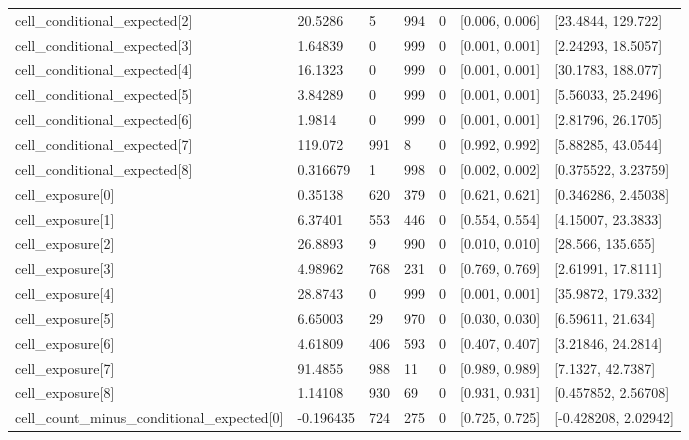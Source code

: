 \begin{longtable}
{}cell\_\allowbreak{}conditional\_\allowbreak{}expected[2] & 20.5286 & 5 & 994 & 0 & [0.006, 0.006] & [23.4844, 129.722] \\
{}cell\_\allowbreak{}conditional\_\allowbreak{}expected[3] & 1.64839 & 0 & 999 & 0 & [0.001, 0.001] & [2.24293, 18.5057] \\
{}cell\_\allowbreak{}conditional\_\allowbreak{}expected[4] & 16.1323 & 0 & 999 & 0 & [0.001, 0.001] & [30.1783, 188.077] \\
{}cell\_\allowbreak{}conditional\_\allowbreak{}expected[5] & 3.84289 & 0 & 999 & 0 & [0.001, 0.001] & [5.56033, 25.2496] \\
{}cell\_\allowbreak{}conditional\_\allowbreak{}expected[6] & 1.9814 & 0 & 999 & 0 & [0.001, 0.001] & [2.81796, 26.1705] \\
{}cell\_\allowbreak{}conditional\_\allowbreak{}expected[7] & 119.072 & 991 & 8 & 0 & [0.992, 0.992] & [5.88285, 43.0544] \\
{}cell\_\allowbreak{}conditional\_\allowbreak{}expected[8] & 0.316679 & 1 & 998 & 0 & [0.002, 0.002] & [0.375522, 3.23759] \\
{}cell\_\allowbreak{}exposure[0] & 0.35138 & 620 & 379 & 0 & [0.621, 0.621] & [0.346286, 2.45038] \\
{}cell\_\allowbreak{}exposure[1] & 6.37401 & 553 & 446 & 0 & [0.554, 0.554] & [4.15007, 23.3833] \\
{}cell\_\allowbreak{}exposure[2] & 26.8893 & 9 & 990 & 0 & [0.010, 0.010] & [28.566, 135.655] \\
{}cell\_\allowbreak{}exposure[3] & 4.98962 & 768 & 231 & 0 & [0.769, 0.769] & [2.61991, 17.8111] \\
{}cell\_\allowbreak{}exposure[4] & 28.8743 & 0 & 999 & 0 & [0.001, 0.001] & [35.9872, 179.332] \\
{}cell\_\allowbreak{}exposure[5] & 6.65003 & 29 & 970 & 0 & [0.030, 0.030] & [6.59611, 21.634] \\
{}cell\_\allowbreak{}exposure[6] & 4.61809 & 406 & 593 & 0 & [0.407, 0.407] & [3.21846, 24.2814] \\
{}cell\_\allowbreak{}exposure[7] & 91.4855 & 988 & 11 & 0 & [0.989, 0.989] & [7.1327, 42.7387] \\
{}cell\_\allowbreak{}exposure[8] & 1.14108 & 930 & 69 & 0 & [0.931, 0.931] & [0.457852, 2.56708] \\
{}cell\_\allowbreak{}count\_\allowbreak{}minus\_\allowbreak{}conditional\_\allowbreak{}expected[0] & -0.196435 & 724 & 275 & 0 & [0.725, 0.725] & [-0.428208, 2.02942] \\

\end{longtable}
